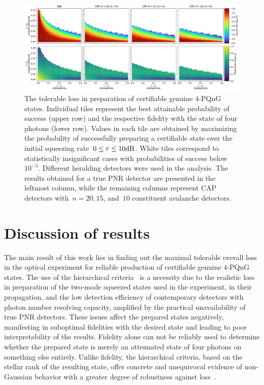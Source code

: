 \documentclass{article}
\begin{document}
%
%

\begin{figure}[h]
  \begin{center}
    \includegraphics[width = \columnwidth]{import/202411/paper_unified_04.pdf}
  \end{center}
  \caption{
    The tolerable loss in preparation of certifiable genuine $4$-PQnG states. Individual tiles represent the best attainable probability of success (upper row) and the respective fidelity with the state of four photons (lower row). Values in each tile are obtained by maximizing the probability of successfully preparing a certifiable state over the initial squeezing rate~${0 \leq r \leq 10\mathrm{dB}}$. White tiles correspond to statistically insignificant cases with probabilities of success below $10^{-5}$. Different heralding detectors were used in the analysis. The results obtained for a true PNR detector are presented in the leftmost column, while the remaining columns represent CAP detectors with~${n = 20, 15}$, and~$10$ constituent avalanche detectors.
  }
  \label{f-res-4}
\end{figure}

\section{Discussion of results}

The main result of this work lies in finding out the maximal tolerable overall loss in the optical experiment for reliable production of certifiable genuine $4$-PQnG states. The use of the hierarchical criteria~\cite{lachman2019} is a necessity due to the realistic loss in preparation of the two-mode squeezed states used in the experiment, in their propagation, and the low detection efficiency of contemporary detectors with photon number resolving capacity, amplified by the practical unavailability of true PNR detectors. These issues affect the prepared states negatively, manifesting in suboptimal fidelities with the desired state and leading to poor interpretability of the results. Fidelity alone can not be reliably used to determine whether the prepared state is merely an attenuated state of four photons on something else entirely. Unlike fidelity, the hierarchical criteria, based on the stellar rank of the resulting state, offer concrete and unequivocal evidence of non-Gaussian behavior with a greater degree of robustness against loss~\cite{lachman2019}.
\end{document}
